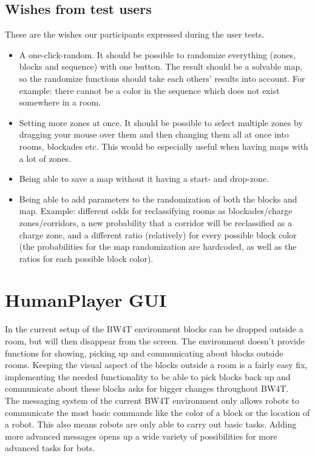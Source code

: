\subsection*{Wishes from test users}
These are the wishes our participants expressed during the user tests.

\begin{itemize}
\item A one-click-random. It should be possible to randomize everything (zones, blocks and sequence) with one button. The result should be a solvable map, so the randomize functions should take each others' results into account. For example: there cannot be a color in the sequence which does not exist somewhere in a room.
\item Setting more zones at once. It should be possible to select multiple zones by dragging your mouse over them and then changing them all at once into rooms, blockades etc. This would be especially useful when having maps with a lot of zones. 
\item Being able to save a map without it having a start- and drop-zone. 
\item Being able to add parameters to the randomization of both the blocks and map. Example: different odds for reclassifying rooms as blockades/charge zones/corridors, a new probability that a corridor will be reclassified as a charge zone, and a different ratio (relatively) for every possible block color (the probabilities for the map randomization are hardcoded, as well as the ratios for each possible block color).
\end{itemize}

\section{HumanPlayer GUI}
In the current setup of the BW4T environment blocks can be dropped outside a room, but will then disappear from the screen. The environment doesn't provide functions for showing, picking up and communicating about blocks outside rooms. Keeping the visual aspect of the blocks outside a room is a fairly easy fix, implementing the needed functionality to be able to pick blocks back up and communicate about these blocks asks for bigger changes throughout BW4T. \\

The messaging system of the current BW4T environment only allows robots to communicate the most basic commands like the color of a block or the location of a robot. This also means robots are only able to carry out basic tasks. Adding more advanced messages opens up a wide variety of possibilities for more advanced tasks for bots.

